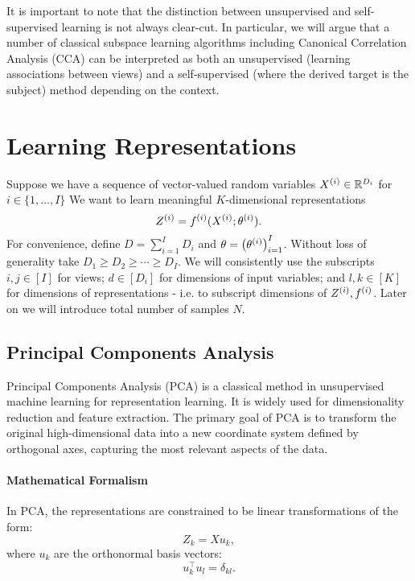 It is important to note that the distinction between unsupervised and self-supervised learning is not always clear-cut.
In particular, we will argue that a number of classical subspace learning algorithms including Canonical Correlation
Analysis (CCA) can be interpreted as both an unsupervised (learning associations between views) and a self-supervised (where the derived target is the subject) method depending on the context.



\section{Learning Representations}

Suppose we have a sequence of vector-valued random variables $X^{(i)} \in \mathbb{R}^{D_i}$ for $i \in \{1, \dots, I \}$
We want to learn meaningful $K$-dimensional representations
\begin{equation}\label{eq:general-form-of-representations}
    Z^{(i)} = f^{(i)}( X^{(i)}; \theta^{(i)}).
\end{equation}
For convenience, define $D = \sum_{i=1}^I D_i$ and $\theta = \left(\theta^{(i)}\right)_{i=1}^I$.
Without loss of generality take $D_1 \geq D_2 \geq \cdots \geq D_I$.
We will consistently use the subscripts $i,j \in [I]$ for views;
$d \in [D_i]$ for dimensions of input variables;
and $l,k \in [K]$ for dimensions of representations - i.e. to subscript dimensions of $Z^{(i)}, f^{(i)}$.
Later on we will introduce total number of samples $N$.

\subsection{Principal Components Analysis}

Principal Components Analysis (PCA)\cite{hotelling1933analysis} is a classical method in unsupervised machine learning for representation learning.
It is widely used for dimensionality reduction and feature extraction.
The primary goal of PCA is to transform the original high-dimensional data into a new coordinate system defined by orthogonal axes, capturing the most relevant aspects of the data.

\paragraph{Mathematical Formalism} In PCA, the representations are constrained to be linear transformations of the form:
\begin{equation}\label{eq:pca-linear-function-def}
    Z_k = X u_k,
\end{equation}
where $u_k$ are the orthonormal basis vectors:
\begin{equation}\label{eq:pca-orthonormality-constraint}
    u_k^\top u_l = \delta_{kl}.
\end{equation}

